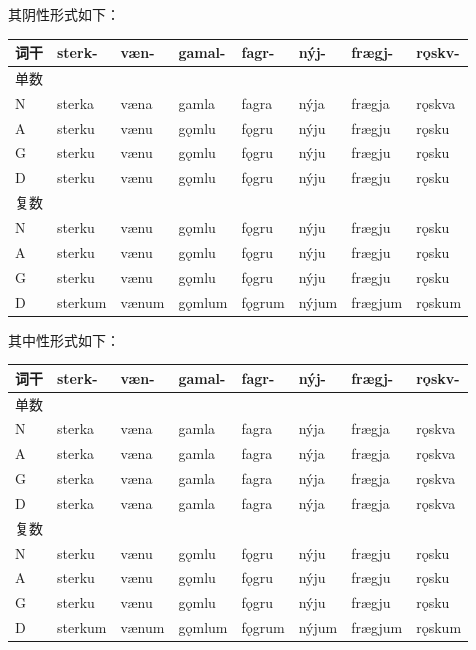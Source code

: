 其阴性形式如下：

\begin{longtable}{llllllll}
    \toprule
    词干 & sterk-  & væn-  & gamal- & fagr-  & nýj-  & frægj-  & rǫskv- \\
    \midrule
    \endhead
    \bottomrule
    \endfoot
    单数 &         &       &        &        &       &         &        \\
    N    & sterka  & væna  & gamla  & fagra  & nýja  & frægja  & rǫskva \\
    A    & sterku  & vænu  & gǫmlu  & fǫgru  & nýju  & frægju  & rǫsku  \\
    G    & sterku  & vænu  & gǫmlu  & fǫgru  & nýju  & frægju  & rǫsku  \\
    D    & sterku  & vænu  & gǫmlu  & fǫgru  & nýju  & frægju  & rǫsku  \\
    复数 &         &       &        &        &       &         &        \\
    N    & sterku  & vænu  & gǫmlu  & fǫgru  & nýju  & frægju  & rǫsku  \\
    A    & sterku  & vænu  & gǫmlu  & fǫgru  & nýju  & frægju  & rǫsku  \\
    G    & sterku  & vænu  & gǫmlu  & fǫgru  & nýju  & frægju  & rǫsku  \\
    D    & sterkum & vænum & gǫmlum & fǫgrum & nýjum & frægjum & rǫskum \\
\end{longtable}

其中性形式如下：

\begin{longtable}{llllllll}
    \toprule
    词干 & sterk-  & væn-  & gamal- & fagr-  & nýj-  & frægj-  & rǫskv- \\
    \midrule
    \endhead
    \bottomrule
    \endfoot
    单数 &         &       &        &        &       &         &        \\
    N    & sterka  & væna  & gamla  & fagra  & nýja  & frægja  & rǫskva \\
    A    & sterka  & væna  & gamla  & fagra  & nýja  & frægja  & rǫskva \\
    G    & sterka  & væna  & gamla  & fagra  & nýja  & frægja  & rǫskva \\
    D    & sterka  & væna  & gamla  & fagra  & nýja  & frægja  & rǫskva \\
    复数 &         &       &        &        &       &         &        \\
    N    & sterku  & vænu  & gǫmlu  & fǫgru  & nýju  & frægju  & rǫsku  \\
    A    & sterku  & vænu  & gǫmlu  & fǫgru  & nýju  & frægju  & rǫsku  \\
    G    & sterku  & vænu  & gǫmlu  & fǫgru  & nýju  & frægju  & rǫsku  \\
    D    & sterkum & vænum & gǫmlum & fǫgrum & nýjum & frægjum & rǫskum \\
\end{longtable}

